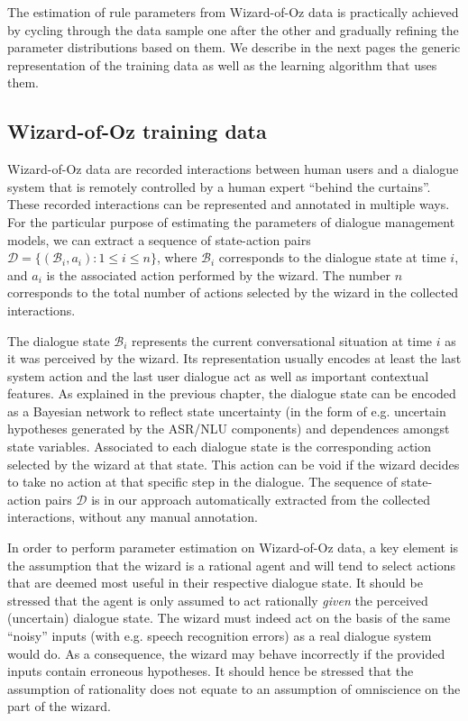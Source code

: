 The estimation of rule parameters from Wizard-of-Oz data is practically achieved by cycling through the data sample one after the other and gradually refining the parameter distributions based on them. We describe in the next pages the generic representation of the training data as well as the learning algorithm that uses them. 

\subsection{Wizard-of-Oz training data}
\label{sec:rule-supervised-oz}

Wizard-of-Oz data are recorded interactions between human users and a dialogue system that is remotely controlled by a human expert ``behind the curtains''. These recorded interactions can be represented and annotated in multiple ways.  For the particular purpose of estimating the parameters of dialogue management models, we can extract a sequence of state-action pairs $\mathcal{D} = \{( \mathcal{B}_i, a_i ) : 1 \leq i \leq n\}$, where $\mathcal{B}_i$ corresponds to the dialogue state at time $i$, and $a_i$ is the associated action performed by the wizard.  The number $n$ corresponds to the total number of actions selected by the wizard in the collected interactions. 

The dialogue state $\mathcal{B}_i$ represents the current conversational situation at time $i$ as it was perceived by the wizard.  Its representation usually encodes at least the last system action and the last user dialogue act as well as important contextual features.  As explained in the previous chapter, the dialogue state can be encoded as a Bayesian network to reflect state uncertainty (in the form of e.g. uncertain hypotheses generated by the ASR/NLU components) and dependences amongst state variables. Associated to each dialogue state is the corresponding action selected by the wizard at that state. This action can be void if the wizard decides to take no action at that specific step in the dialogue. The sequence of state-action pairs $\mathcal{D}$ is in our approach automatically extracted from the collected interactions, without any manual annotation.  

In order to perform parameter estimation on Wizard-of-Oz data, a key element is the assumption that the wizard is a rational agent and will tend to select actions that are deemed most useful in their respective dialogue state. It should be stressed that the agent is only assumed to act rationally \textit{given} the perceived (uncertain) dialogue state. The wizard must indeed act on the basis of the same ``noisy'' inputs (with e.g. speech recognition errors) as a real dialogue system would do.  As a consequence, the wizard may behave incorrectly if the provided inputs contain erroneous hypotheses. It should hence be stressed that the assumption of rationality does not equate to an assumption of omniscience on the part of the wizard. 

